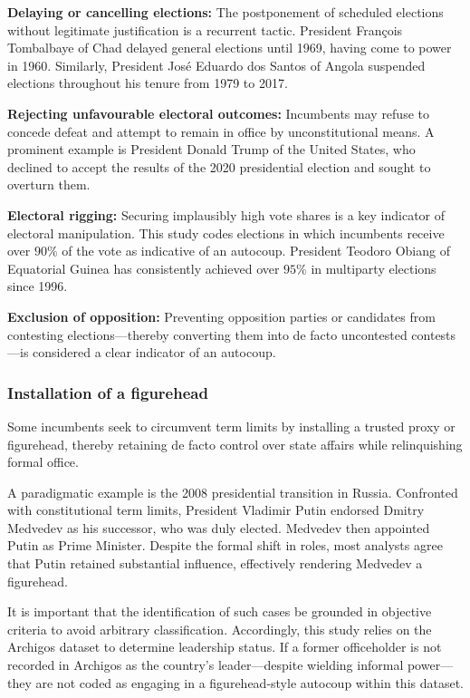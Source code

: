 \documentclass[
  12pt,
]{report}
\begin{document}
\textbf{Delaying or cancelling elections:} The postponement of scheduled
elections without legitimate justification is a recurrent tactic.
President François Tombalbaye of Chad delayed general elections until
1969, having come to power in 1960. Similarly, President José Eduardo
dos Santos of Angola suspended elections throughout his tenure from 1979
to 2017.

\textbf{Rejecting unfavourable electoral outcomes:} Incumbents may
refuse to concede defeat and attempt to remain in office by
unconstitutional means. A prominent example is President Donald Trump of
the United States, who declined to accept the results of the 2020
presidential election and sought to overturn them.

\textbf{Electoral rigging:} Securing implausibly high vote shares is a
key indicator of electoral manipulation. This study codes elections in
which incumbents receive over \(90\%\) of the vote as indicative of an
autocoup. President Teodoro Obiang of Equatorial Guinea has consistently
achieved over \(95\%\) in multiparty elections since 1996.

\textbf{Exclusion of opposition:} Preventing opposition parties or
candidates from contesting elections---thereby converting them into de
facto uncontested contests---is considered a clear indicator of an
autocoup.

\subsubsection*{Installation of a
figurehead}\label{installation-of-a-figurehead}

Some incumbents seek to circumvent term limits by installing a trusted
proxy or figurehead, thereby retaining de facto control over state
affairs while relinquishing formal office.

A paradigmatic example is the 2008 presidential transition in Russia.
Confronted with constitutional term limits, President Vladimir Putin
endorsed Dmitry Medvedev as his successor, who was duly elected.
Medvedev then appointed Putin as Prime Minister. Despite the formal
shift in roles, most analysts agree that Putin retained substantial
influence, effectively rendering Medvedev a figurehead.

It is important that the identification of such cases be grounded in
objective criteria to avoid arbitrary classification. Accordingly, this
study relies on the Archigos dataset to determine leadership status. If
a former officeholder is not recorded in Archigos as the country's
leader---despite wielding informal power---they are not coded as
engaging in a figurehead-style autocoup within this dataset.
\end{document}
